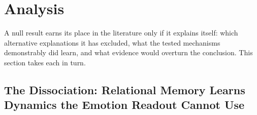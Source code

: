 \section{Analysis}
\label{sec:analysis}

A null result earns its place in the literature only if it explains itself: which alternative explanations it has excluded, what the tested mechanisms demonstrably did learn, and what evidence would overturn the conclusion. This section takes each in turn.

\subsection{The Dissociation: Relational Memory Learns Dynamics the Emotion Readout Cannot Use}
\label{sec:dissociation}


